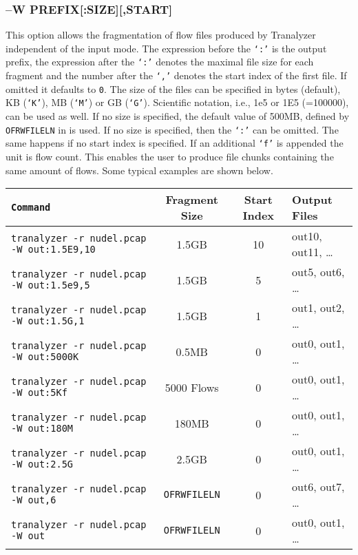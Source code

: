 \subsubsection{--W PREFIX[:SIZE][,START]}
This option allows the fragmentation of flow files produced by Tranalyzer independent of the input mode. The expression before the {\tt `:'} is the output prefix, the expression after the {\tt `:'} denotes the maximal file size for each fragment and the number after the {\tt `,'} denotes the start index of the first file. If omitted it defaults to {\tt 0}. The size of the files can be specified in bytes (default), KB ({\tt `K'}), MB ({\tt `M'}) or GB ({\tt `G'}). Scientific notation, i.e., 1e5 or 1E5 (=100000), can be used as well. If no size is specified, the default value of 500MB, defined by {\tt OFRWFILELN} in  is used. If no size is specified, then the {\tt `:'} can be omitted. The same happens if no start index is specified. If an additional {\tt `f'} is appended the unit is flow count. This enables the user to produce file chunks containing the same amount of flows. Some typical examples are shown below.

\begin{longtable}{>{\tt}lccl}
    \toprule
    {\bf Command} & {\bf Fragment Size} & {\bf Start Index} & {\bf Output Files}\\
    \midrule\endhead%
    tranalyzer -r nudel.pcap -W out:1.5E9,10 & 1.5GB                  & 10 & out10, out11, \ldots\\
    tranalyzer -r nudel.pcap -W out:1.5e9,5  & 1.5GB                  &  5 & out5, out6, \ldots\\
    tranalyzer -r nudel.pcap -W out:1.5G,1   & 1.5GB                  &  1 & out1, out2, \ldots\\
    tranalyzer -r nudel.pcap -W out:5000K    & 0.5MB                  &  0 & out0, out1, \ldots\\
    tranalyzer -r nudel.pcap -W out:5Kf      & 5000 Flows             &  0 & out0, out1, \ldots\\
    tranalyzer -r nudel.pcap -W out:180M     & 180MB                  &  0 & out0, out1, \ldots\\
    tranalyzer -r nudel.pcap -W out:2.5G     & 2.5GB                  &  0 & out0, out1, \ldots\\
    tranalyzer -r nudel.pcap -W out,6        & {\tt\small OFRWFILELN} &  0 & out6, out7, \ldots\\
    tranalyzer -r nudel.pcap -W out          & {\tt\small OFRWFILELN} &  0 & out0, out1, \ldots\\
    \bottomrule
\end{longtable}

